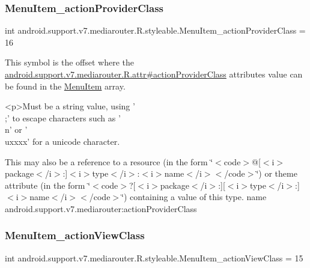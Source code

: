\subsubsection{\texorpdfstring{Menu\+Item\+\_\+action\+Provider\+Class}{MenuItem\_actionProviderClass}}
{\footnotesize\ttfamily int android.\+support.\+v7.\+mediarouter.\+R.\+styleable.\+Menu\+Item\+\_\+action\+Provider\+Class = 16\hspace{0.3cm}{\ttfamily [static]}}

This symbol is the offset where the \hyperlink{classandroid_1_1support_1_1v7_1_1mediarouter_1_1R_1_1attr_afffef61df88a3a95b368b88b417477ae}{android.\+support.\+v7.\+mediarouter.\+R.\+attr\#action\+Provider\+Class} attribute\textquotesingle{}s value can be found in the \hyperlink{classandroid_1_1support_1_1v7_1_1mediarouter_1_1R_1_1styleable_ab3f2d4af0d17a47efacf7fd82df9528d}{Menu\+Item} array.

\begin{DoxyVerb}      <p>Must be a string value, using '\\;' to escape characters such as '\\n' or '\\uxxxx' for a unicode character.
\end{DoxyVerb}
 

This may also be a reference to a resource (in the form \char`\"{}$<$code$>$@\mbox{[}$<$i$>$package$<$/i$>$\+:\mbox{]}$<$i$>$type$<$/i$>$\+:$<$i$>$name$<$/i$>$$<$/code$>$\char`\"{}) or theme attribute (in the form \char`\"{}$<$code$>$?\mbox{[}$<$i$>$package$<$/i$>$\+:\mbox{]}\mbox{[}$<$i$>$type$<$/i$>$\+:\mbox{]}$<$i$>$name$<$/i$>$$<$/code$>$\char`\"{}) containing a value of this type.  name android.\+support.\+v7.\+mediarouter\+:action\+Provider\+Class \mbox{\label{classandroid_1_1support_1_1v7_1_1mediarouter_1_1R_1_1styleable_a545b5468a5f0d9703946118b0bd71bc3}} 
\subsubsection{\texorpdfstring{Menu\+Item\+\_\+action\+View\+Class}{MenuItem\_actionViewClass}}
{\footnotesize\ttfamily int android.\+support.\+v7.\+mediarouter.\+R.\+styleable.\+Menu\+Item\+\_\+action\+View\+Class = 15\hspace{0.3cm}{\ttfamily [static]}}

